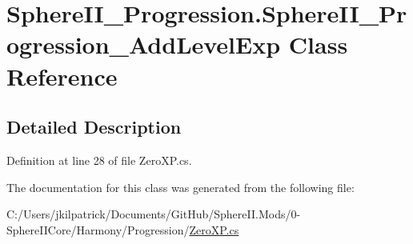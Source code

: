 \hypertarget{class_sphere_i_i___progression_1_1_sphere_i_i___progression___add_level_exp}{}\section{Sphere\+I\+I\+\_\+\+Progression.\+Sphere\+I\+I\+\_\+\+Progression\+\_\+\+Add\+Level\+Exp Class Reference}
\label{class_sphere_i_i___progression_1_1_sphere_i_i___progression___add_level_exp}


\subsection{Detailed Description}


Definition at line 28 of file Zero\+X\+P.\+cs.



The documentation for this class was generated from the following file\+:\begin{DoxyCompactItemize}
\item 
C\+:/\+Users/jkilpatrick/\+Documents/\+Git\+Hub/\+Sphere\+I\+I.\+Mods/0-\/\+Sphere\+I\+I\+Core/\+Harmony/\+Progression/\mbox{\hyperlink{_zero_x_p_8cs}{Zero\+X\+P.\+cs}}\end{DoxyCompactItemize}

